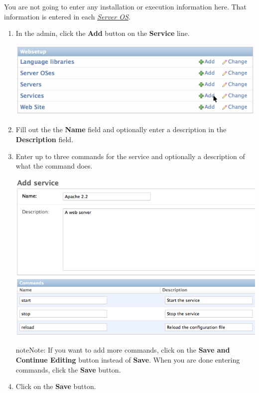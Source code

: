 \documentclass[letterpaper,10pt,english]{manual}
\begin{document}
You are not going to enter any installation or execution information here. That information is entered in each \hyperlink{models-serveros}{\emph{Server OS}}.
\begin{enumerate}
\item {} 
In the admin, click the \textbf{Add} button on the \textbf{Service} line.

\includegraphics{add_service1.png}

\item {} 
Fill out the the \textbf{Name} field and optionally enter a description in the \textbf{Description} field.

\item {} 
Enter up to three commands for the service and optionally a description of what the command does.

\includegraphics{add_service_form.png}

\begin{notice}{note}{Note:}
If you want to add more commands, click on the \textbf{Save and Continue Editing} button instead of \textbf{Save}. When you are done entering commands, click the \textbf{Save} button.
\end{notice}

\item {} 
Click on the \textbf{Save} button.

\end{enumerate}
\end{document}
